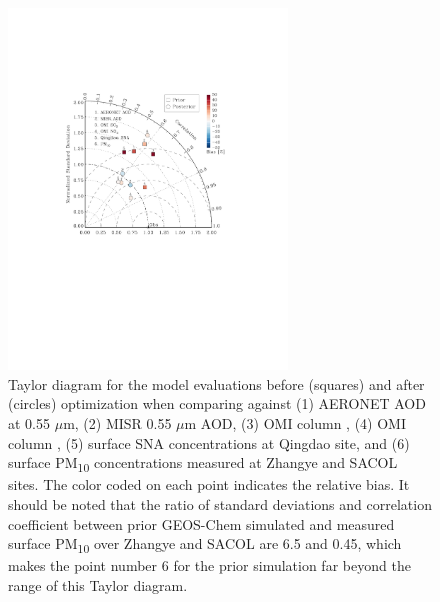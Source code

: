  \begin{figure}[t]
  \centering
  \includegraphics[width={0.66\textwidth}]{figures/a12.pdf}
  \caption[Taylor diagram for the model evaluations before and
after optimization.]{Taylor diagram for the model evaluations before
(squares) and after (circles) optimization when comparing against (1)
AERONET AOD at 0.55 $\mu$m, (2) MISR 0.55 $\mu$m AOD, (3) OMI column
, (4) OMI column , (5) surface SNA concentrations at
Qingdao site, and (6) surface PM\textsubscript{10} concentrations
measured at Zhangye and SACOL sites. The color coded on each point
indicates the relative bias. It should be noted that the ratio of
standard deviations and correlation coefficient between prior GEOS-Chem
simulated and measured surface PM\textsubscript{10} over Zhangye and
SACOL are 6.5 and 0.45, which makes the point number 6 for the prior
simulation far beyond the range of this Taylor diagram.}
  \label{fig:taylor}
 \end{figure}

